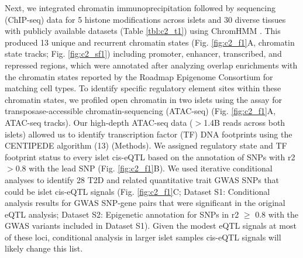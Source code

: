 Next, we integrated chromatin immunoprecipitation followed by sequencing (ChIP-seq) data for 5 histone modifications across islets \cite{parkerChromatinStretchEnhancer2013, scottGeneticRegulatorySignature2016} and 30 diverse tissues with publicly available datasets (Table \ref{tbl:c2_t1}) \cite{theroadmapepigenomicsconsortiumIntegrativeAnalysis1112015, mikkelsenComparativeEpigenomicAnalysis2010, buenrostroTranspositionNativeChromatin2013} using ChromHMM \cite{ernstDiscoveryCharacterizationChromatin2010, ernstMappingAnalysisChromatin2011, ernstChromHMMAutomatingChromatin2012}. This produced 13 unique and recurrent chromatin states (Fig. \ref{fig:c2_f1}A, chromatin state tracks; Fig. \ref{fig:c2_sf1}) including promoter, enhancer, transcribed, and repressed regions, which were annotated after analyzing overlap enrichments with the chromatin states reported by the Roadmap Epigenome Consortium \cite{theroadmapepigenomicsconsortiumIntegrativeAnalysis1112015} for matching cell types. To identify specific regulatory element sites within these chromatin states, we profiled open chromatin in two islets using the assay for transposase-accessible chromatin-sequencing (ATAC-seq) \cite{pique-regiAccurateInferenceTranscription2011} (Fig. \ref{fig:c2_f1}A, ATAC-seq tracks). Our high-depth ATAC-seq data ($>$1.4B reads across both islets) allowed us to identify transcription factor (TF) DNA footprints using the CENTIPEDE algorithm (13) (Methods). We assigned regulatory state and TF footprint status to every islet cis-eQTL based on the annotation of SNPs with r2 $>$0.8 with the lead SNP (Fig. \ref{fig:c2_f1}B).  We used iterative conditional analyses \cite{scottGeneticRegulatorySignature2016} to identify 28 T2D and related quantitative trait GWAS SNPs that could be islet cis-eQTL signals (Fig. \ref{fig:c2_f1}C; Dataset S1: Conditional analysis results for GWAS SNP-gene pairs that were significant in the original eQTL analysis; Dataset S2: Epigenetic annotation for SNPs in r2 $\geq$ 0.8 with the GWAS variants included in Dataset S1). Given the modest eQTL signals at most of these loci, conditional analysis in larger islet samples cis-eQTL signals will likely change this list.

